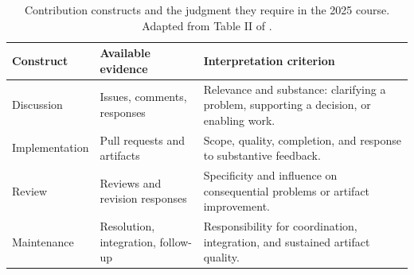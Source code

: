 \begin{table}[htbp]
\caption{Contribution constructs and the judgment they require in the 2025 course. Adapted from Table II of \citet{seetmanuscript}.}
\label{tab:ch7-rubric}
\small\renewcommand{\arraystretch}{1.18}
\begin{tabularx}{\linewidth}{@{}>{\raggedright\arraybackslash}p{28mm}>{\raggedright\arraybackslash}p{38mm}>{\raggedright\arraybackslash}X@{}}\toprule
Construct & Available evidence & Interpretation criterion\\\midrule
Discussion & Issues, comments, responses & Relevance and substance: clarifying a problem, supporting a decision, or enabling work.\\
Implementation & Pull requests and artifacts & Scope, quality, completion, and response to substantive feedback.\\
Review & Reviews and revision responses & Specificity and influence on consequential problems or artifact improvement.\\
Maintenance & Resolution, integration, follow-up & Responsibility for coordination, integration, and sustained artifact quality.\\\bottomrule
\end{tabularx}
\end{table}
